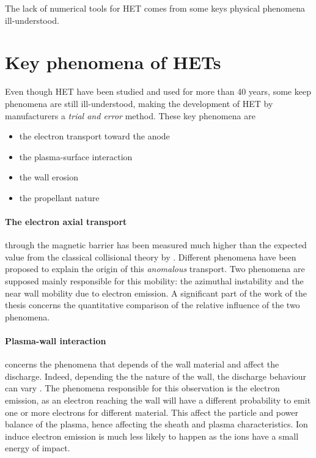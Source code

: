 The lack of numerical tools for \ac{HET}  comes from some keys physical phenomena ill-understood.


\section*{Key phenomena of \ac{HET}s}

Even though \ac{HET} have been studied and used for more than 40 years, some keep phenomena are still ill-understood, making the development of \ac{HET} by manufacturers a \emph{trial and error} method.
These key phenomena are
\begin{itemize}
  \item the electron transport toward the anode
  \item the plasma-surface interaction 
  \item the wall erosion
  \item the propellant nature
\end{itemize}


\paragraph{The electron axial transport}  through the magnetic barrier has been measured much higher than the expected value from the classical collisional theory by \citet{meezan2001}.
Different phenomena have been proposed to explain the origin of this \emph{anomalous} transport.
Two phenomena are supposed mainly responsible for this mobility\string: the azimuthal instability and the near wall mobility due to electron emission.
A significant part of the work of the thesis concerns the quantitative comparison of the relative influence of the two phenomena.

\paragraph{Plasma-wall interaction} concerns the phenomena that depends of the wall material and affect the discharge.
Indeed, depending the the nature of the wall, the discharge behaviour can vary \citep{gascon2003}.
The phenomena responsible for this observation is the electron emission, as an electron reaching the wall will have a different probability to emit one or more electrons for different material.
This affect the particle and power balance of the plasma, hence affecting the sheath and plasma characteristics.
Ion induce electron emission is much less likely to happen as the ions have a small energy of impact.

